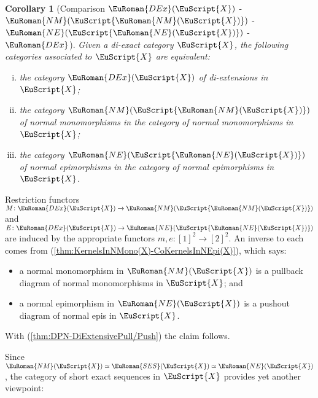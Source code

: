 \documentclass [12pt,oneside]{book}%
\makeatletter
\theoremstyle{captionstyle}  %
\newtheorem{corollary}[theorem]{Corollary}
\renewenvironment{proof}[1][\proofname]{\vspace{-2ex}\par       %
	\pushQED{\qed}%
	\normalfont \topsep6\p@\@plus6\p@\relax
	\trivlist
	\item[\hskip\labelsep
	            \color{proofcaption}\bfseries                %
	            #1\@addpunct{\quad}]\ignorespaces
}{%
	\popQED\endtrivlist\@endpefalse
}
\newenvironment{ulist}{			%
	\begin{itemize}}{
	\end{itemize}
}
\newenvironment{thmlist}{		%
	\begin{enumerate}[(i)]}{
	\end{enumerate}
}
\newcommand{\from}{\colon}				%
\newcommand{\Ord}[1]{[#1]}										          %
\newcommand{\Ctgry}[1]{\EuScript{#1}}					%
\newcommand{\NMonoCat}[1]{\EuRoman{NM}(\Ctgry{#1})}				%
\newcommand{\NEpiCat}[1]{\EuRoman{NE}(\Ctgry{#1})}				%
\newcommand{\SESCat}[1]{\EuRoman{SES}(\Ctgry{#1})}				%
\newcommand{\DExCat}[1]{\EuRoman{DEx}(\EuScript{#1})}							%
\newcommand{\DExTag}{ - {\color{Cerulean} $\EuRoman{DEx}$}}			%
\makeatother
\begin{document}
\begin{corollary}[Comparison $\DExCat{X}$ - $\NMonoCat{\NMonoCat{X}}$ - $\NEpiCat{\NEpiCat{X}}$ \DExTag]
    \label{thm:DEx(X)-NM(NM(X))-NE(NE(X))}%
    Given a di-exact category $\Ctgry{X}$, the following categories associated to $\Ctgry{X}$ are equivalent: %
    \begin{thmlist}
        \item the category $\DExCat{X}$ of di-extensions in $\Ctgry{X}$;
        \item the category $\NMonoCat{\NMonoCat{X}}$ of normal monomorphisms in the category of normal monomorphisms in $\Ctgry{X}$;
        \item the category $\NEpiCat{\NEpiCat{X}}$ of normal epimorphisms in the category of normal epimorphisms in $\Ctgry{X}$.
    \end{thmlist}
\end{corollary}
\begin{proof}
    Restriction functors $M\from \DExCat{X}\to \NMonoCat{\NMonoCat{X}}$ and $E\from \DExCat{X}\to \NEpiCat{\NEpiCat{X}}$ are induced by the appropriate functors $m,e\from \Ord{1}^2\to \Ord{2}^2$. An inverse to each comes from (\ref{thm:KernelsInNMono(X)-CoKernelsInNEpi(X)}), which says:
    \begin{ulist}
        \item a normal monomorphism in $\NMonoCat{X}$ is a pullback diagram of normal monomorphisms in $\Ctgry{X}$; and
        \item a normal epimorphism in $\NEpiCat{X}$ is a pushout diagram of normal epis in $\Ctgry{X}$.
    \end{ulist}
    With (\ref{thm:DPN-DiExtensivePull/Push}) the claim follows.
\end{proof}

Since $\NMonoCat{X}\simeq\SESCat{X}\simeq\NEpiCat{X}$, the category of short exact sequences in $\Ctgry{X}$ provides yet another viewpoint:
\end{document}
